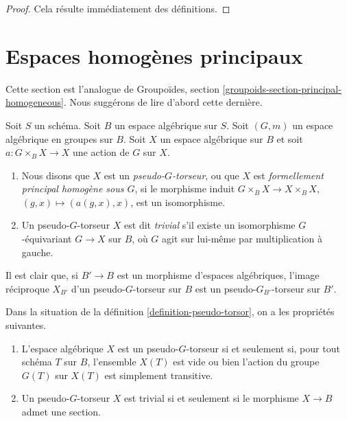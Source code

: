 \begin{proof}
Cela résulte immédiatement des définitions.
\end{proof}









\section{Espaces homogènes principaux}
\label{section-principal-homogeneous}

\noindent
Cette section est l'analogue de Groupoïdes, section \ref{groupoids-section-principal-homogeneous}. Nous suggérons de lire d'abord cette dernière.

\begin{definition}
\label{definition-pseudo-torsor}
Soit $S$ un schéma. Soit $B$ un espace algébrique sur $S$. Soit $(G, m)$ un espace algébrique en groupes sur $B$. Soit $X$ un espace algébrique sur $B$ et soit $a : G \times_B X \to X$ une action de $G$ sur $X$.
\begin{enumerate}
\item Nous disons que $X$ est un {\it pseudo-$G$-torseur}, ou que $X$ est {\it formellement principal homogène sous $G$}, si le morphisme induit $G \times_B X \to X \times_B X$, $(g, x) \mapsto (a(g, x), x)$, est un isomorphisme.
\item Un pseudo-$G$-torseur $X$ est dit {\it trivial} s'il existe un isomorphisme $G$-équivariant $G \to X$ sur $B$, où $G$ agit sur lui-même par multiplication à gauche.
\end{enumerate}
\end{definition}

\noindent
Il est clair que, si $B' \to B$ est un morphisme d'espaces algébriques, l'image réciproque $X_{B'}$ d'un pseudo-$G$-torseur sur $B$ est un pseudo-$G_{B'}$-torseur sur $B'$.

\begin{lemma}
\label{lemma-characterize-trivial-pseudo-torsors}
Dans la situation de la définition \ref{definition-pseudo-torsor}, on a les propriétés suivantes.
\begin{enumerate}
\item L'espace algébrique $X$ est un pseudo-$G$-torseur si et seulement si, pour tout schéma $T$ sur $B$, l'ensemble $X(T)$ est vide ou bien l'action du groupe $G(T)$ sur $X(T)$ est simplement transitive.
\item Un pseudo-$G$-torseur $X$ est trivial si et seulement si le morphisme $X \to B$ admet une section.
\end{enumerate}
\end{lemma}

